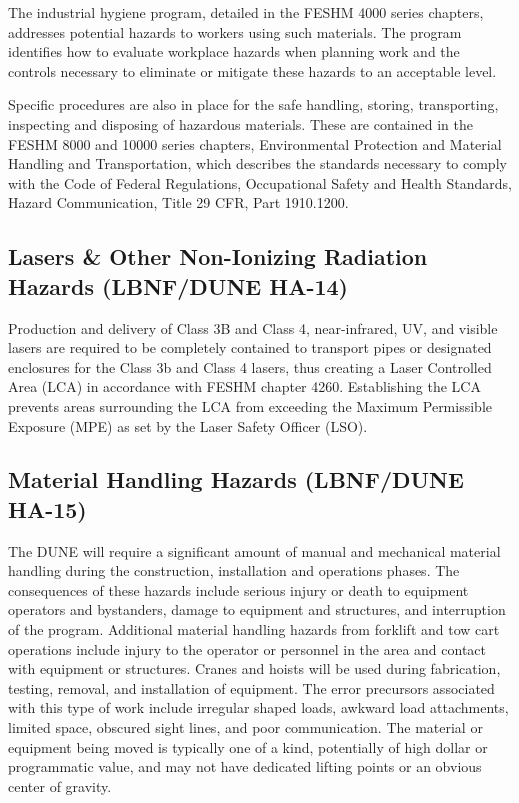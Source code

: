 The industrial hygiene program, detailed in the FESHM 4000 series
chapters, addresses potential hazards to workers using such
materials. The program identifies how to evaluate workplace hazards
when planning work and the controls necessary to eliminate or mitigate
these hazards to an acceptable level.

Specific procedures are also in place for the safe handling, storing,
transporting, inspecting and disposing of hazardous materials. These
are contained in the FESHM 8000 and 10000 series chapters,
Environmental Protection and Material Handling and Transportation,
which describes the standards necessary to comply with the Code of
Federal Regulations, Occupational Safety and Health Standards, Hazard
Communication, Title 29 CFR, Part 1910.1200.


\subsection{Lasers \& Other Non-Ionizing Radiation Hazards (LBNF/DUNE HA-14)}

Production and delivery of Class 3B and Class 4, near-infrared, UV,
and visible lasers are required to be completely contained to
transport pipes or designated enclosures for the Class 3b and Class 4
lasers, thus creating a Laser Controlled Area (LCA) in accordance with
FESHM chapter 4260.  Establishing the LCA prevents areas surrounding
the LCA from exceeding the Maximum Permissible Exposure (MPE) as set
by the Laser Safety Officer (LSO).

\subsection{Material Handling Hazards (LBNF/DUNE HA-15)}

The DUNE will require a significant amount of manual and mechanical
material handling during the construction, installation and operations
phases.  The consequences of these hazards include serious injury or
death to equipment operators and bystanders, damage to equipment and
structures, and interruption of the program.  Additional material
handling hazards from forklift and tow cart operations include injury
to the operator or personnel in the area and contact with equipment or
structures. Cranes and hoists will be used during fabrication,
testing, removal, and installation of equipment. The error precursors
associated with this type of work include irregular shaped loads,
awkward load attachments, limited space, obscured sight lines, and
poor communication.  The material or equipment being moved is
typically one of a kind, potentially of high dollar or programmatic
value, and may not have dedicated lifting points or an obvious center
of gravity.

